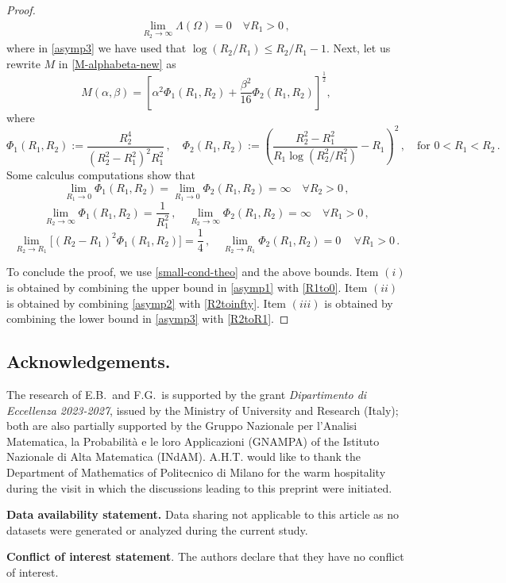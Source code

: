 \documentclass[a4paper,11pt]{amsart}
\numberwithin{equation}{section}
\numberwithin{figure}{section}
\begin{document}
\begin{proof}
\begin{eqnarray}
		&& \lim_{R_2\to\infty}\Lambda(\Omega)=0\quad\forall R_1>0\, , \label{asymp2}
	\end{eqnarray}
	where in \eqref{asymp3} we have used that $\log(R_2/R_1)\leq R_2/R_1-1.$
	Next, let us rewrite $M$ in \eqref{M-alphabeta-new} as
	$$
	M(\alpha, \beta)= \left[\alpha^2\Phi_1(R_1,R_2)+\frac{\beta^2}{16}\Phi_2(R_1,R_2)\right]^{\tfrac{1}{2}},
	$$
	where
	$$
	\Phi_1(R_1,R_2):=\frac{R_2^4}{(R_2^2 -R_1^2)^2R_1^2}\, ,\quad\Phi_2(R_1,R_2):=\left(\frac{R_2^2-R_1^2}{R_1\log(R_2^2/R_1^2)}-R_1\right)^2\, ,
	\quad\mbox{for }0<R_1<R_2\, .
	$$
	Some calculus computations show that
	\begin{equation}\label{R1to0}
\lim_{R_1\to0}\Phi_1(R_1,R_2)=\lim_{R_1\to0}\Phi_2(R_1,R_2)=\infty\quad\forall R_2>0\, ,
	\end{equation}
	\begin{equation}\label{R2toinfty}
		\lim_{R_2\to\infty}\Phi_1(R_1,R_2)=\frac1{R_1^2}\, ,\quad\lim_{R_2\to\infty}\Phi_2(R_1,R_2)=\infty\quad\forall R_1>0\, ,
	\end{equation}
	\begin{equation}\label{R2toR1}
		\lim_{R_2\to R_1}\big[(R_2-R_1)^2\Phi_1(R_1,R_2)\big]=\frac14 \, ,\quad\lim_{R_2\to R_1}\Phi_2(R_1,R_2)=0\, \quad\forall R_1>0\, .
	\end{equation}
	
	To conclude the proof, we use \eqref{small-cond-theo} and the above bounds.
	Item $(i)$ is obtained by combining the upper bound in \eqref{asymp1} with \eqref{R1to0}.
	Item $(ii)$ is obtained by combining \eqref{asymp2} with \eqref{R2toinfty}.
	Item $(iii)$ is obtained by combining the lower bound in \eqref{asymp3} with \eqref{R2toR1}.
\end{proof}

\bigskip


\subsection*{Acknowledgements.} The research of E.B.\ and 
F.G.\ is supported by the grant \textit{Dipartimento di 
Eccellenza 2023-2027},
issued by the Ministry of University and Research (Italy); both are also partially supported by the Gruppo Nazionale
per l’Analisi Matematica, la Probabilità e le loro Applicazioni (GNAMPA) of the
Istituto Nazionale di Alta Matematica (INdAM). A.H.T. would like to thank the Department of Mathematics of Politecnico di Milano for the warm hospitality during the visit in which the discussions leading to this preprint were initiated.
\par\smallskip
\noindent
{\bf Data availability statement.} Data sharing not applicable to this article as no datasets were generated or analyzed during the current study.
\par\smallskip
\noindent
{\bf Conflict of interest statement}.  The authors declare that they have no conflict of interest.

\bigskip



\end{document}
